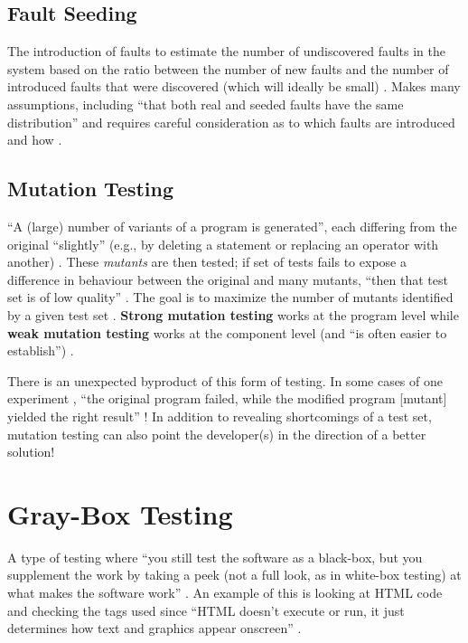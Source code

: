 \subsection[Fault Seeding]{Fault Seeding \citep[pp.~427-428]{vanVliet2000}}

The introduction of faults to estimate the number of undiscovered faults in the
system based on the ratio between the number of new faults and the number of
introduced faults that were discovered (which will ideally be small)
\citep[p.~427]{vanVliet2000}. Makes many assumptions, including
``that both real and seeded faults have the same distribution'' and requires
careful consideration as to which faults are introduced and how
\citep[p.~427]{vanVliet2000}.

\subsection[Mutation Testing]{Mutation Testing \citep[pp.~428-429]{vanVliet2000}}
\label{chap:testing:sec:mutation-testing}

``A (large) number of variants of a program is generated'', each differing from
the original ``slightly'' (e.g., by deleting a statement or replacing an
operator with another) \citep[p.~428]{vanVliet2000}. These
\emph{mutants} are then tested; if set of tests fails to expose a difference in
behaviour between the original and many mutants, ``then that test set is of low
quality'' \citep[pp.~428-429]{vanVliet2000}. The goal is to maximize
the number of mutants identified by a given test set
\citep[p.~429]{vanVliet2000}. \textbf{Strong mutation testing} works
at the program level while \textbf{weak mutation testing} works at the
component level (and ``is often easier to establish'')
\citep[p.~429]{vanVliet2000}.

There is an unexpected byproduct of this form of testing. In some cases of one
experiment , ``the original program failed,
while the modified program [mutant] yielded the right result''
\citep[p.~432]{vanVliet2000}! In addition to revealing shortcomings
of a test set, mutation testing can also point the developer(s) in the
direction of a better solution!

\section[Gray-Box Testing]{Gray-Box Testing \citep[pp.~218-220]{Patton2006}}
A type of testing where ``you still test the software as a black-box, but you
supplement the work by taking a peek (not a full look, as in white-box testing)
at what makes the software work'' \citep[p.~218]{Patton2006}. An
example of this is looking at HTML code and checking the tags used since
``HTML doesn't execute or run, it just determines how text and graphics appear
onscreen'' \citep[p.~220]{Patton2006}.

